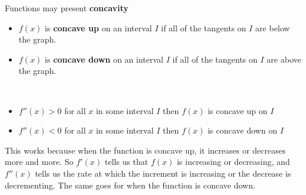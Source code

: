 \documentclass[a4paper]{article}
\begin{document}
\begin{minipage}{0.5\textwidth}
\end{minipage}
\begin{minipage}{0.5\textwidth}
    Functions may present \textbf{concavity}
    \hphantom{ } \\
    \begin{itemize}
        \item \(f(x)\) is \textbf{concave up} on an interval \(I\) if all of the tangents on \(I\) are below the graph.
        \item \(f(x)\) is \textbf{concave down} on an interval \(I\) if all of the tangents on \(I\) are above the graph.
    \end{itemize}
    \hphantom{ } \\
    \begin{itemize}
        \item \(f''(x)>0\) for all \(x\) in some interval \(I\) then \(f(x)\) is concave up on \(I\)
        \item \(f''(x)<0\) for all \(x\) in some interval \(I\) then \(f(x)\) is concave down on \(I\)
    \end{itemize}

    This works because when the function is concave up, it increases or decreases more and more. So \(f'(x)\)
    tells us that \(f(x)\) is increasing or decreasing, and \(f''(x)\) tells us the rate at which the increment
    is increasing or the decrease is decrementing. The same goes for when the function is concave down.
\end{minipage}
\end{document}
